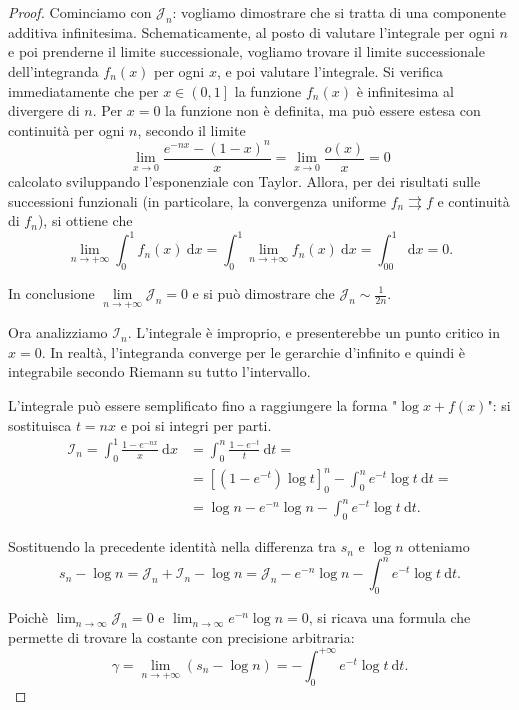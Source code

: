 \begin{proof}
	Cominciamo con $\mathcal{J}_n$: vogliamo dimostrare che si tratta di una componente additiva infinitesima. Schematicamente, al posto di valutare l'integrale per ogni $n$ e poi prenderne il limite successionale, vogliamo trovare il limite successionale dell'integranda $f_n(x)$ per ogni $x$, e poi valutare l'integrale. Si verifica immediatamente che per $x\in\left( 0,1 \right]$ la funzione $f_n(x)$ è infinitesima al divergere di $n$. Per $x=0$ la funzione non è definita, ma può essere estesa con continuità per ogni $n$, secondo il limite
	\[
		\lim\limits_{x\to0}\frac{e^{-nx}-(1-x)^n}{x}=\lim\limits_{x\to0}\frac{o(x)}{x}=0
	\]
	calcolato sviluppando l'esponenziale con Taylor. Allora, per dei risultati sulle successioni funzionali (in particolare, la convergenza uniforme $f_n \rightrightarrows f$ e continuità di $f_n$), si ottiene che
	\[
		\lim\limits_{n\to+\infty}\int^1_0f_n(x)\:\mathrm{d}x=\int^1_0\lim\limits_{n\to+\infty}f_n(x)\:\mathrm{d}x=\int^1_00\:\mathrm{d}x=0.
	\]

	In conclusione $\lim\limits_{n\to+\infty}\mathcal{J}_n=0$ e si può dimostrare che $\mathcal{J}_n\sim\frac{1}{2n}$.

	Ora analizziamo $\mathcal{I}_n$. L'integrale è improprio, e presenterebbe un punto critico in $x=0$. In realtà, l'integranda converge per le gerarchie d'infinito e quindi è integrabile secondo Riemann su tutto l'intervallo.

	L'integrale può essere semplificato fino a raggiungere la forma "$\log x +f(x)$": si sostituisca $t=nx$ e poi si integri per parti.
	\begin{equation*}
		\begin{split}
			\mathcal{I}_n=\int^1_0\frac{1-e^{-nx}}{x}\:\mathrm{d}x&=\int^n_0\frac{1-e^{-t}}{t}\:\mathrm{d}t=\\
			&=\left[\left(1-e^{-t}\right)\log t\right]^n_0 - \int^n_0 e^{-t} \log t \:\mathrm{d}t=\\
			&=\log n-e^{-n}\log n-\int^n_0e^{-t}\log t \:\mathrm{d}t.
		\end{split}
	\end{equation*}

	Sostituendo la precedente identità nella differenza tra $s_n$ e $\log n$ otteniamo
	\[
		s_n-\log n=\mathcal{J}_n+\mathcal{I}_n-\log n=\mathcal{J}_n-e^{-n}\log n-\int^n_0 e^{-t}\log t \:\mathrm{d}t.
	\]

	Poichè $\lim_{n\to\infty} \mathcal{J}_n=0$ e $\lim_{n\to\infty} e^{-n}\log n=0$, si ricava una formula che permette di trovare la costante con precisione arbitraria:
	\[
		\gamma=\lim\limits_{n\to+\infty}(s_n-\log n)=-\int^{+\infty}_0e^{-t}\log t \:\mathrm{d}t.
	\]


\end{proof}
